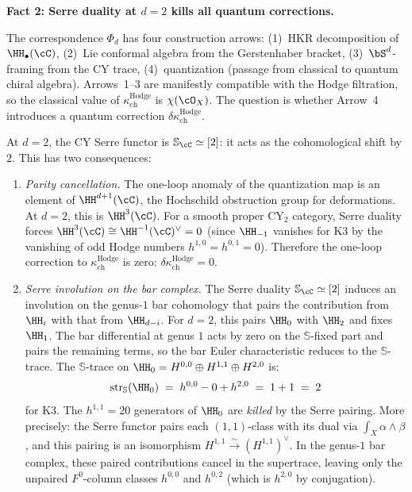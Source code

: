 \begin{remark}
\medskip\noindent
\textbf{Fact 2: Serre duality at $d = 2$ kills all quantum corrections.}

\smallskip\noindent
The correspondence $\Phi_d$ has four construction arrows: (1)~HKR decomposition of $\HH_\bullet(\cC)$, (2)~Lie conformal algebra from the Gerstenhaber bracket, (3)~$\bS^d$-framing from the CY trace, (4)~quantization (passage from classical to quantum chiral algebra). Arrows~1--3 are manifestly compatible with the Hodge filtration, so the classical value of $\kappa_{\mathrm{ch}}^{\mathrm{Hodge}}$ is $\chi(\cO_X)$. The question is whether Arrow~4 introduces a quantum correction $\delta\kappa_{\mathrm{ch}}^{\mathrm{Hodge}}$.

At $d = 2$, the CY Serre functor is $\mathbb{S}_\cC \simeq [2]$: it acts as the cohomological shift by $2$. This has two consequences:
\begin{enumerate}[label=(\alph*)]
 \item \emph{Parity cancellation.} The one-loop anomaly of the quantization map is an element of $\HH^{d+1}(\cC)$, the Hochschild obstruction group for deformations. At $d = 2$, this is $\HH^3(\cC)$. For a smooth proper CY$_2$ category, Serre duality forces $\HH^3(\cC) \cong \HH^{-1}(\cC)^\vee = 0$ (since $\HH_{-1}$ vanishes for K3 by the vanishing of odd Hodge numbers $h^{1,0} = h^{0,1} = 0$). Therefore the one-loop correction to $\kappa_{\mathrm{ch}}^{\mathrm{Hodge}}$ is zero: $\delta\kappa_{\mathrm{ch}}^{\mathrm{Hodge}} = 0$.
 \item \emph{Serre involution on the bar complex.} The Serre duality $\mathbb{S}_\cC \simeq [2]$ induces an involution on the genus-$1$ bar cohomology that pairs the contribution from $\HH_i$ with that from $\HH_{d-i}$. For $d = 2$, this pairs $\HH_0$ with $\HH_2$ and fixes $\HH_1$. The bar differential at genus $1$ acts by zero on the $\mathbb{S}$-fixed part and pairs the remaining terms, so the bar Euler characteristic reduces to the $\mathbb{S}$-trace. The $\mathbb{S}$-trace on $\HH_0 = H^{0,0} \oplus H^{1,1} \oplus H^{2,0}$ is:
 \[
 \mathrm{str}_{\mathbb{S}}(\HH_0) \;=\; h^{0,0} - 0 + h^{2,0} \;=\; 1 + 1 \;=\; 2
 \]
 for K3. The $h^{1,1} = 20$ generators of $\HH_0$ are \emph{killed} by the Serre pairing. More precisely: the Serre functor pairs each $(1,1)$-class with its dual via $\int_X \alpha \wedge \beta$, and this pairing is an isomorphism $H^{1,1} \xrightarrow{\sim} (H^{1,1})^\vee$. In the genus-$1$ bar complex, these paired contributions cancel in the supertrace, leaving only the unpaired $F^0$-column classes $h^{0,0}$ and $h^{0,2}$ (which is $h^{2,0}$ by conjugation).
\end{enumerate}


\end{remark}
